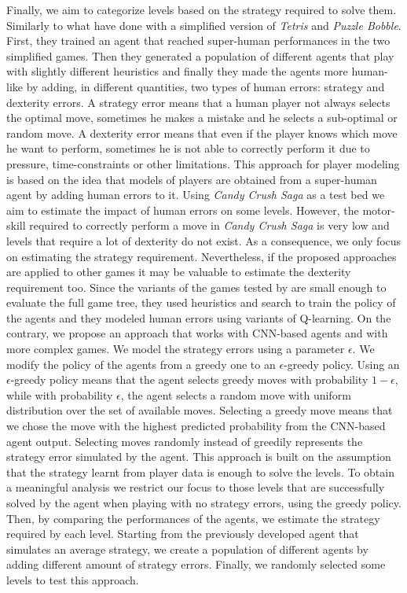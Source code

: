 Finally, we aim to categorize levels based on the strategy required to solve them.
Similarly to what \textcite{isaksen_simulating_2017} have done with a simplified version of \textit{Tetris} and \textit{Puzzle Bobble}. First, they trained an agent that reached super-human performances in the two simplified games. Then they generated a population of different agents that play with slightly different heuristics and finally they made the agents more human-like by adding, in different quantities, two types of human errors: strategy and dexterity errors. A strategy error means that a human player not always selects the optimal move, sometimes he makes a mistake and he selects a sub-optimal or random move. A dexterity error means that even if the player knows which move he want to perform, sometimes he is not able to correctly perform it due to pressure, time-constraints or other limitations. 
This approach for player modeling is based on the idea that models of players are obtained from a super-human agent by adding human errors to it.
Using \textit{Candy Crush Saga} as a test bed we aim to estimate the impact of human errors on some levels. However, the motor-skill required to correctly perform a move in \textit{Candy Crush Saga} is very low and levels that require a lot of dexterity do not exist. As a consequence, we only focus on estimating the strategy requirement. Nevertheless, if the proposed approaches are applied to other games it may be valuable to estimate the dexterity requirement too. 
Since the variants of the games tested by \citeauthor{isaksen_simulating_2017} are small enough to evaluate the full game tree, they used heuristics and search to train the policy of the agents and they modeled human errors using variants of Q-learning. On the contrary, we propose an approach that works with \acs{CNN}-based agents and with more complex games. 
We model the strategy errors using a parameter $\epsilon$. We modify the policy of the agents from a greedy one to an $\epsilon$-greedy policy. Using an $\epsilon$-greedy policy means that the agent selects greedy moves with probability $1 - \epsilon$, while with probability $\epsilon$, the agent selects a random move with uniform distribution over the set of available moves. Selecting a greedy move means that we chose the move with the highest predicted probability from the \acs{CNN}-based agent output. Selecting moves randomly instead of greedily represents the strategy error simulated by the agent. This approach is built on the assumption that the strategy learnt from player data is enough to solve the levels. To obtain a meaningful analysis we restrict our focus to those levels that are successfully solved by the agent when playing with no strategy errors, using the greedy policy. Then, by comparing the performances of the agents, we estimate the strategy required by each level. Starting from the previously developed agent that simulates an average strategy, we create a population of different agents by adding different amount of strategy errors. Finally, we randomly selected some levels to test this approach. 

